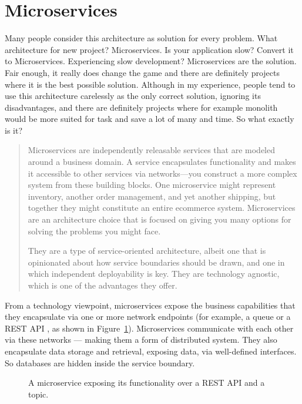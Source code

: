 \section{Microservices}
Many people consider this architecture as solution for every problem. What architecture for new project? Microservices. Is your application slow? Convert it to Microservices. Experiencing slow development? Microservices are the solution. Fair enough, it really does change the game and there are definitely projects where it is the best possible solution. Although in my experience, people tend to use this architecture carelessly as the only correct solution, ignoring its disadvantages, and there are definitely projects where for example monolith would be more suited for task and save a lot of many and time. So what exactly is it?

\begin{quote}
    Microservices are independently releasable services that are modeled around a business domain. A service encapsulates functionality and makes it accessible to other services via networks—you construct a more complex system from these building blocks. One microservice might represent inventory, another order management, and yet another shipping, but together they might constitute an entire ecommerce system. Microservices are an architecture choice that is focused on giving you many options for solving the problems you might face. \cite{BUILDING_MS_WHAT_ARE}

    They are a type of service-oriented architecture, albeit one that is opinionated about how service boundaries should be drawn, and one in which independent deployability is key. They are technology agnostic, which is one of the advantages they offer. \cite{BUILDING_MS_WHAT_ARE}
\end{quote}


From a technology viewpoint, microservices expose the business capabilities that they encapsulate via one or more network endpoints \cite{MON_TO_MS_MICROSERVICE} (for example, a queue or a REST API \cite{BUILDING_MS_WHAT_ARE}, as shown in Figure~\ref{img:microservices_basic}). Microservices communicate with each other via these networks — making them a form of distributed system. They also encapsulate data storage and retrieval, exposing data, via well-defined interfaces. So databases are hidden inside the service boundary. \cite{MON_TO_MS_MICROSERVICE}

\begin{figure}
    \centering
    
    \caption{A microservice exposing its functionality over a REST API and a topic. \cite{BUILDING_MS_WHAT_ARE}\label{img:microservices_basic}}
\end{figure}

